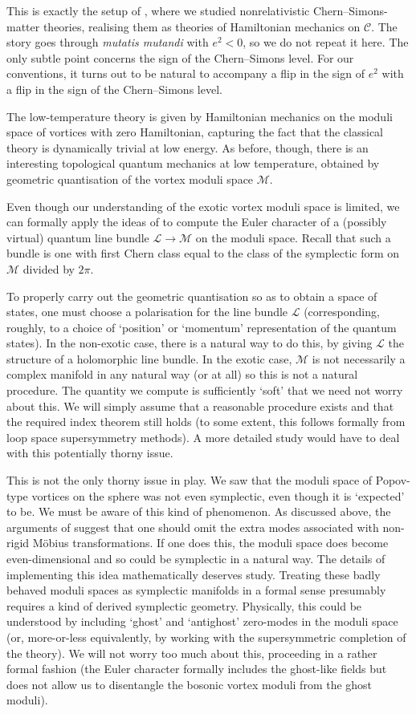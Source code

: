 \documentclass[10pt]{article}
\newcommand{\mc}[1]{\mathcal{#1}}
\theoremstyle{definition}
\begin{document}
This is exactly the setup of \cite{waltonVC}, where we studied nonrelativistic Chern--Simons-matter theories, realising them as theories of Hamiltonian mechanics on \(\mc{C}\). The story goes through \emph{mutatis mutandi} with \(e^2 <0\), so we do not repeat it here. The only subtle point concerns the sign of the Chern--Simons level. For our conventions, it turns out to be natural to accompany a flip in the sign of \(e^2\) with a flip in the sign of the Chern--Simons level.

The low-temperature theory is given by Hamiltonian mechanics on the moduli space of vortices with zero Hamiltonian, capturing the fact that the classical theory is dynamically trivial at low energy. As before, though, there is an interesting topological quantum mechanics at low temperature, obtained by geometric quantisation of the vortex moduli space \(\mc{M}\). 

Even though our understanding of the exotic vortex moduli space is limited, we can formally apply the ideas of \cite{waltonVC} to compute the Euler character of a (possibly virtual) quantum line bundle \(\mc{L} \to \mc{M}\) on the moduli space. Recall that such a bundle is one with first Chern class equal to the class of the symplectic form on \(\mc{M}\) divided by \(2\pi\). 

To properly carry out the geometric quantisation so as to obtain a space of states, one must choose a polarisation for the line bundle \(\mc{L}\) (corresponding, roughly, to a choice of `position' or `momentum' representation of the quantum states). In the non-exotic case, there is a natural way to do this, by giving \(\mc{L}\) the structure of a holomorphic line bundle. In the exotic case, \(\mc{M}\) is not necessarily a complex manifold in any natural way (or at all) so this is not a natural procedure. The quantity we compute is sufficiently `soft' that we need not worry about this. We will simply assume that a reasonable procedure exists and that the required index theorem still holds (to some extent, this follows formally from loop space supersymmetry methods). A more detailed study would have to deal with this potentially thorny issue.

This is not the only thorny issue in play. We saw that the moduli space of Popov-type vortices on the sphere was not even symplectic, even though it is `expected' to be. We must be aware of this kind of phenomenon. As discussed above, the arguments of \cite{turnerQO} suggest that one should omit the extra modes associated with non-rigid M\"obius transformations. If one does this, the moduli space does become even-dimensional and so could be symplectic in a natural way. The details of implementing this idea mathematically deserves study. Treating these badly behaved moduli spaces as symplectic manifolds in a formal sense presumably requires a kind of derived symplectic geometry. Physically, this could be understood by including `ghost' and `antighost' zero-modes in the moduli space (or, more-or-less equivalently, by working with the supersymmetric completion of the theory). We will not worry too much about this, proceeding in a rather formal fashion (the Euler character formally includes the ghost-like fields but does not allow us to disentangle the bosonic vortex moduli from the ghost moduli).
\end{document}
